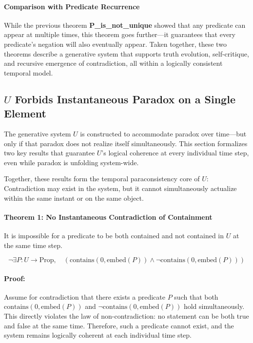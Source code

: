 \documentclass[12pt]{article}
\begin{document}
\paragraph{Comparison with Predicate Recurrence}
While the previous theorem \textbf{P\_is\_not\_unique} showed that any predicate can appear at multiple times, this theorem goes further—it guarantees that every predicate’s negation will also eventually appear. Taken together, these two theorems describe a generative system that supports truth evolution, self-critique, and recursive emergence of contradiction, all within a logically consistent temporal model.


\subsection{\( U \) Forbids Instantaneous Paradox on a Single Element}

The generative system \( U \) is constructed to accommodate paradox over time—but only if that paradox does not realize itself simultaneously. This section formalizes two key results that guarantee \( U \)'s logical coherence at every individual time step, even while paradox is unfolding system-wide.

Together, these results form the temporal paraconsistency core of \( U \):  
Contradiction may exist in the system, but it cannot simultaneously actualize within the same instant or on the same object.


\paragraph{Theorem 1: No Instantaneous Contradiction of Containment}
It is impossible for a predicate to be both contained and not contained in \( U \) at the same time step.

\[
\neg \exists P: U \to \text{Prop}, \quad
\left( \text{contains}(0, \text{embed}(P)) \wedge \neg \text{contains}(0, \text{embed}(P)) \right)
\]

\paragraph{Proof:}

Assume for contradiction that there exists a predicate \( P \) such that both \\ 
\( \text{contains}(0, \text{embed}(P)) \) and \( \neg \text{contains}(0, \text{embed}(P)) \) hold simultaneously. This directly violates the law of non-contradiction: no statement can be both true and false at the same time. Therefore, such a predicate cannot exist, and the system remains logically coherent at each individual time step.
\end{document}
